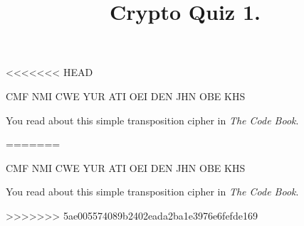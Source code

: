 \documentclass[handout]{ximera}
\title{Crypto Quiz 1.}
\begin{document}
\begin{abstract} {}
\end{abstract}
\maketitle
<<<<<<< HEAD
\begin{exercise}
CMF NMI CWE YUR ATI OEI DEN JHN OBE KHS 

\begin{hint} You read about this simple transposition cipher in \textit{The Code Book}.
\end{hint}


\end{exercise}
=======
\begin{question}
CMF NMI CWE YUR ATI OEI DEN JHN OBE KHS \\

\begin{hint} You read about this simple transposition cipher in \textit{The Code Book}.
\end{hint}
\end{question}
>>>>>>> 5ae005574089b2402eada2ba1e3976e6fefde169
\end{document}
